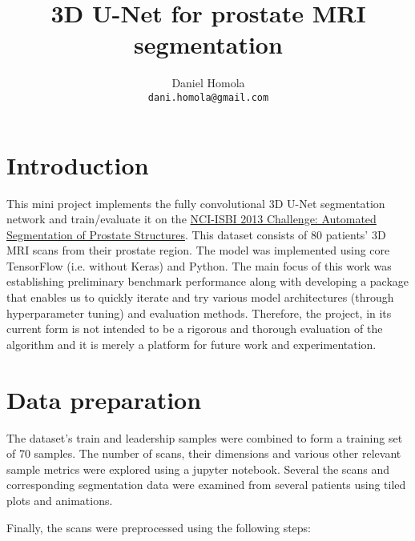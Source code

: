 \documentclass{article}
\title{3D U-Net for prostate MRI segmentation}
\author{
  Daniel Homola \\
  \texttt{dani.homola@gmail.com} \\
}
\begin{document}
\maketitle


\section{Introduction}
This mini project implements the fully convolutional 3D U-Net segmentation network \cite{_i_ek_2016} and train/evaluate it on the \href{https://goo.gl/fw8qku}{NCI-ISBI 2013 Challenge: Automated Segmentation of Prostate Structures}. This dataset consists of 80 patients' 3D MRI scans from their prostate region. The model was implemented using core TensorFlow (i.e. without Keras) and Python. The main focus of this work was establishing preliminary benchmark performance along with developing a package that enables us to quickly iterate and try various model architectures (through hyperparameter tuning) and evaluation methods. Therefore, the project, in its current form is not intended to be a rigorous and thorough evaluation of the algorithm and it is merely a platform for future work and experimentation.

\section{Data preparation}

The dataset's train and leadership samples were combined to form a training set of 70 samples. The number of scans, their dimensions and various other relevant sample metrics were explored using a jupyter notebook. Several the scans and corresponding segmentation data were examined from several patients using tiled plots and animations. 

Finally, the scans were preprocessed using the following steps:
\end{document}

